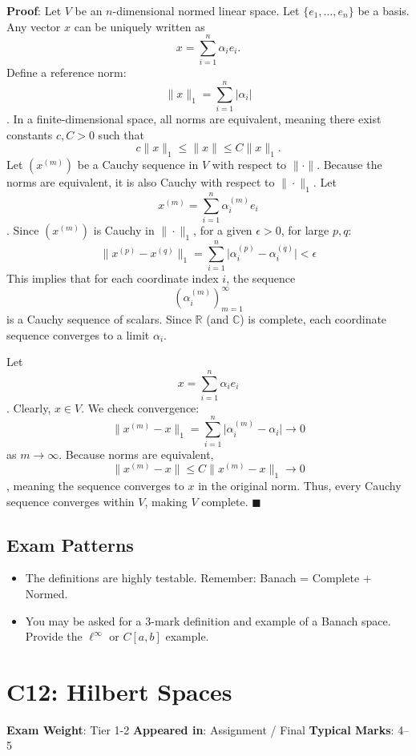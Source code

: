\documentclass[
]{article}
\providecommand{\tightlist}{%
  \setlength{\itemsep}{0pt}\setlength{\parskip}{0pt}}
\renewenvironment{quote}
  {\begin{tcolorbox}[
     colback=calloutbg,
     colframe=calloutframe,
     colupper=callouttext,
     arc=3pt,
     boxrule=0.5pt,
     leftrule=0.5pt,
     borderline west={3pt}{0pt}{calloutaccent},
     left=8pt,
     right=8pt,
     top=6pt,
     bottom=6pt
   ]}
  {\end{tcolorbox}}
\begin{document}
\textbf{Proof}: Let \(V\) be an \(n\)-dimensional normed linear space.
Let \(\lbrace e_1, \dots, e_n\rbrace\) be a basis. Any vector \(x\) can
be uniquely written as
\[
x = \sum_{i=1}^n \alpha_i e_i.
\]
Define a reference norm:
\[
\|x\|_1 = \sum_{i=1}^n \lvert \alpha_i \rvert
\]
. In a finite-dimensional space, all norms are equivalent, meaning there
exist constants \(c, C > 0\) such that
\[
c\|x\|_1 \leq \|x\| \leq C\|x\|_1.
\]
Let \((x^{(m)})\) be a Cauchy sequence in \(V\) with respect to
\(\|\cdot\|\). Because the norms are equivalent, it is also Cauchy with
respect to \(\|\cdot\|_1\). Let
\[
x^{(m)} = \sum_{i=1}^n \alpha_i^{(m)} e_i
\]
. Since \((x^{(m)})\) is Cauchy in \(\|\cdot\|_1\), for a given
\(\epsilon > 0\), for large \(p, q\):
\[
\|x^{(p)} - x^{(q)}\|_1 = \sum_{i=1}^n \lvert \alpha_i^{(p)} - \alpha_i^{(q)} \rvert < \epsilon
\]
This implies that for each coordinate index \(i\), the sequence
\[
(\alpha_i^{(m)})_{m=1}^\infty
\]
is a Cauchy sequence of scalars. Since \(\mathbb{R}\) (and
\(\mathbb{C}\)) is complete, each coordinate sequence converges to a
limit \(\alpha_i\).

Let
\[
x = \sum_{i=1}^n \alpha_i e_i
\]
. Clearly, \(x \in V\). We check convergence:
\[
\|x^{(m)} - x\|_1 = \sum_{i=1}^n \lvert \alpha_i^{(m)} - \alpha_i \rvert \to 0
\]
as \(m \to \infty\). Because norms are equivalent,
\[
\|x^{(m)} - x\| \leq C\|x^{(m)} - x\|_1 \to 0
\]
, meaning the sequence converges to \(x\) in the original norm. Thus,
every Cauchy sequence converges within \(V\), making \(V\) complete.
\(\blacksquare\)

\subsection{Exam Patterns}\label{exam-patterns-39}

\begin{itemize}
\tightlist
\item
  The definitions are highly testable. Remember: Banach = Complete +
  Normed.
\item
  You may be asked for a 3-mark definition and example of a Banach
  space. Provide the \(\ell^\infty\) or \(C[a,b]\) example.
\end{itemize}

\section{C12: Hilbert Spaces}\label{c12-hilbert-spaces}

\begin{quote}
\textbf{Exam Weight}: Tier 1-2 \textbar{} \textbf{Appeared in}:
Assignment / Final \textbar{} \textbf{Typical Marks}: 4--5
\end{quote}
\end{document}
